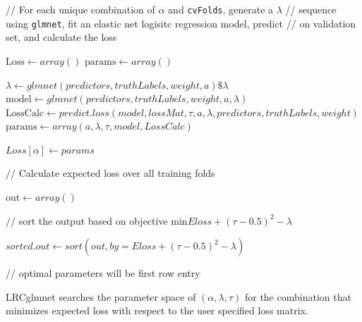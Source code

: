 \documentclass{article}
\begin{document}
\begin{algorithm} \label{lrc}

      

// For each unique combination of $\alpha$ and {\tt cvFolds}, generate a $\lambda$ 
// sequence using {\tt glmnet}, fit an elastic net logisitc regression model, predict 
// on validation set, and calculate the loss

$ \textrm{Loss} \gets array() $\;
$ \textrm{params} \gets array() $\;
 {
   {
  
    $\lambda \gets glmnet(predictors, truthLabels, weight, a)\$\lambda $\;
    $\textrm{model} \gets glmnet(predictors, truthLabels, weight, a, \lambda) $\;
    $\textrm{LossCalc} \gets predict.loss(model, lossMat, \tau, a, \lambda,
    predictors, truthLabels, weight) $\;
    $\textrm{params} \gets array(a, \lambda, \tau, model, LossCalc) $\;
    
  }
  
  $ Loss[ \alpha ] \gets params $\; 
  
}

// Calculate expected loss over all training folds \; 

$\textrm{out} \gets array() $\;


// sort the output based on objective $\textrm{min} Eloss + (\tau - 0.5)^{2} - \lambda$

$sorted.out \gets sort(out, by = Eloss + (\tau - 0.5)^{2} - \lambda) $\;

// optimal parameters will be first row entry
	
\caption{{\sc LRCglmnet} searches the parameter space of $(\alpha, \lambda, \tau)$ for the 
combination that minimizes expected loss with respect to the user specified loss matrix.}
\end{algorithm}  
\end{document}
